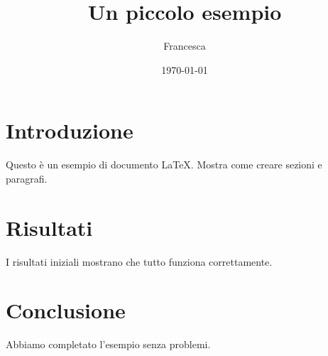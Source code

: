 \documentclass{article}
\title{Un piccolo esempio}
\author{Francesca}
\date{\today}
\begin{document}
\maketitle

\section{Introduzione}
Questo è un esempio di documento LaTeX.  
Mostra come creare sezioni e paragrafi.

\section{Risultati}
I risultati iniziali mostrano che tutto funziona correttamente.

\section{Conclusione}
Abbiamo completato l'esempio senza problemi.
\end{document}
